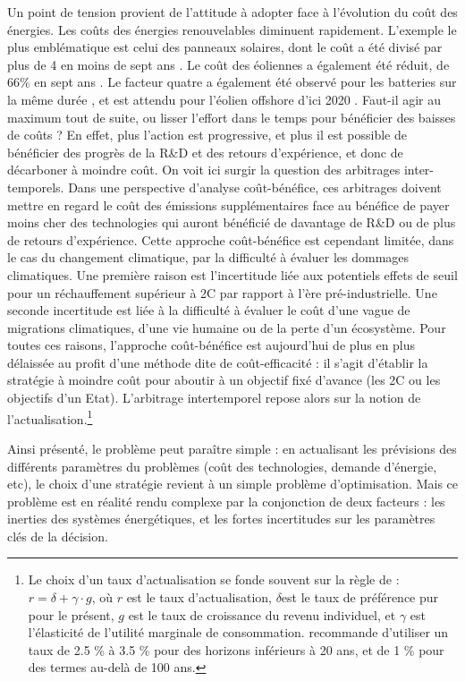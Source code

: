 Un point de tension provient de l’attitude à adopter face à l’évolution du coût des énergies. Les coûts des énergies renouvelables diminuent rapidement. L’exemple le plus emblématique est celui des panneaux solaires, dont le coût a été divisé par plus de 4 en moins de sept ans \citep{Lazard2016}. Le coût des éoliennes a également été réduit, de 66\% en sept ans \citep{Lazard2016}. Le facteur quatre a également été observé pour les batteries sur la même durée \citep{McKinsey2017EV}, et est attendu pour l’éolien offshore d’ici 2020 \citep{McKinsey2017Wind}. Faut-il agir au maximum tout de suite, ou lisser l’effort dans le temps pour bénéficier des baisses de coûts ? En effet, plus l’action est progressive, et plus il est possible de bénéficier des progrès de la R\&D et des retours d’expérience, et donc de décarboner à moindre coût.
On voit ici surgir la question des arbitrages inter-temporels. Dans une perspective d’analyse coût-bénéfice, ces arbitrages doivent mettre en regard le coût des émissions supplémentaires face au bénéfice de payer moins cher des technologies qui auront bénéficié de davantage de R\&D ou de plus de retours d’expérience. Cette approche coût-bénéfice est cependant limitée, dans le cas du changement climatique, par la difficulté à évaluer les dommages climatiques. Une première raison est l’incertitude liée aux potentiels effets de seuil pour un réchauffement supérieur à 2\degree C par rapport à l'ère pré-industrielle. Une seconde incertitude est liée à la difficulté à évaluer le coût d’une vague de migrations climatiques, d’une vie humaine ou de la perte d’un écosystème. 
Pour toutes ces raisons, l’approche coût-bénéfice est aujourd’hui de plus en plus délaissée au profit d’une méthode dite de coût-efficacité : il s’agit d’établir la stratégie à moindre coût pour aboutir à un objectif fixé d’avance (les 2\degree C ou les objectifs d’un Etat). L’arbitrage intertemporel repose alors sur la notion de l’actualisation.\footnote{Le choix d’un taux d’actualisation se fonde souvent sur la règle de \citet{Ramsey1928} : $r = \delta + \gamma \cdot g$,
où $r$ est le taux d’actualisation, $\delta$est le taux de préférence pur pour le présent, $g$ est le taux de croissance du revenu individuel, et $\gamma$ est l’élasticité de l’utilité marginale de consommation. \citet{Gollier2011} recommande d’utiliser un taux de 2.5 \% à 3.5 \% pour des horizons inférieurs à 20 ans, et de 1 \% pour des termes au-delà de 100 ans. 
} 

Ainsi présenté, le problème peut paraître simple : en actualisant les prévisions des différents paramètres du problèmes (coût des technologies, demande d’énergie, etc), le choix d’une stratégie revient à un simple problème d’optimisation. 
Mais ce problème est en réalité rendu complexe par la conjonction de deux facteurs : les inerties des systèmes énergétiques, et les fortes incertitudes sur les paramètres clés de la décision.

